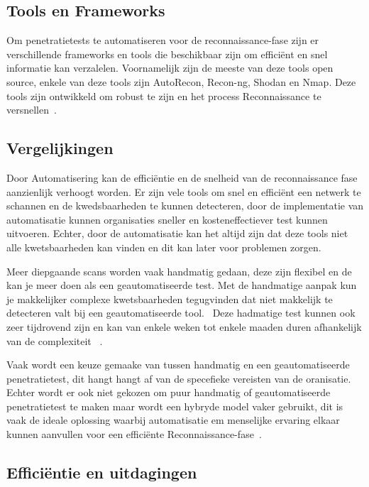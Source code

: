 \subsection{Tools en Frameworks}

Om penetratietests te automatiseren voor de reconnaissance-fase zijn er verschillende frameworks en tools die beschikbaar zijn om 
efficiënt en snel informatie kan verzalelen. Voornamelijk zijn de meeste van deze tools open source, enkele van deze tools zijn 
AutoRecon, Recon-ng, Shodan en Nmap. Deze tools zijn ontwikkeld om robust te zijn en het process Reconnaissance te versnellen~\autocite{Shebli}.


\subsection{Vergelijkingen}

Door Automatisering kan de efficiëntie en de snelheid van de reconnaissance fase aanzienlijk verhoogt worden. Er zijn vele tools om 
snel en efficiënt een netwerk te schannen en de kwedsbaarheden te kunnen detecteren, door de implementatie van automatisatie kunnen 
organisaties sneller en kosteneffectiever test kunnen uitvoeren. Echter, door de automatisatie kan het altijd
zijn dat deze tools niet alle kwetsbaarheden kan vinden en dit kan later voor problemen zorgen.~\autocite{peris}

Meer diepgaande scans worden vaak handmatig gedaan, deze zijn flexibel en de kan je meer doen als een geautomatiseerde test. 
Met de handmatige aanpak kun je makkelijker complexe kwetsbaarheden tegugvinden dat niet makkelijk te detecteren valt bij 
een geautomatiseerde tool.~\autocite{techtarget} Deze hadmatige test kunnen ook zeer tijdrovend zijn en kan van enkele 
weken tot enkele maaden duren afhankelijk van de complexiteit ~\autocite{Shah}.

Vaak wordt een keuze gemaake van tussen handmatig en een geautomatiseerde penetratietest, dit hangt hangt af van de specefieke 
vereisten van de oranisatie. Echter wordt er ook niet gekozen om puur handmatig of geautomatiseerde penetratietest te maken maar wordt 
een hybryde model vaker gebruikt, dit is vaak de ideale oplossing waarbij automatisatie em menselijke ervaring elkaar kunnen 
aanvullen voor een efficiënte Reconnaissance-fase~\autocite{techtarget}.

\subsection{Efficiëntie en uitdagingen}

